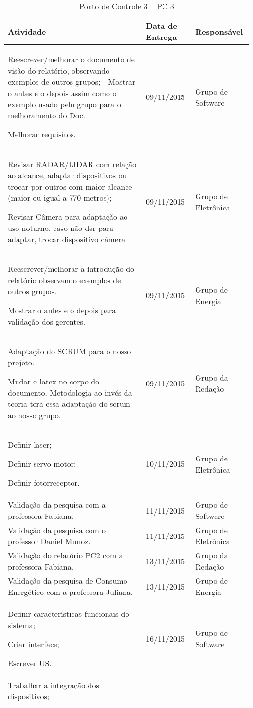 \begin{table}[]
\centering
\caption{Ponto de Controle 3 – PC  3}
\label{custo_equip}
\begin{tabular}{|p{5cm}|p{3cm}|p{5cm}|}
  \hline
  \textbf{Atividade} & \textbf{Data de Entrega} & \textbf{Responsável}\\
  \hline
  Reescrever/melhorar o documento de visão do relatório, observando exemplos de outros grupos;
- Mostrar o antes e o depois assim como o exemplo usado pelo grupo para o melhoramento do Doc.

Melhorar requisitos. & 09/11/2015 & Grupo de Software \\
  \hline
  Revisar RADAR/LIDAR com relação ao alcance, adaptar dispositivos ou trocar por outros com maior alcance (maior ou igual a 770 metros);

  Revisar Câmera para adaptação ao uso noturno, caso não der para adaptar, trocar dispositivo câmera & 09/11/2015 & Grupo de Eletrônica \\
  \hline
  Reescrever/melhorar a introdução do relatório observando exemplos de outros grupos.

 Mostrar o antes e o depois para validação dos gerentes. & 09/11/2015 & Grupo de Energia \\
  \hline
  Adaptação do SCRUM para o nosso projeto.

 Mudar o latex no corpo do documento. Metodologia ao invés da teoria terá essa adaptação do scrum ao nosso grupo.
 & 09/11/2015 & Grupo da Redação \\
  \hline
  Definir laser;

Definir servo motor;

Definir fotorreceptor. & 10/11/2015 & Grupo de Eletrônica \\
  \hline
  Validação da pesquisa com a professora Fabiana. & 11/11/2015 & Grupo de Software \\
  \hline
  Validação da pesquisa com o professor Daniel Munoz. & 11/11/2015 & Grupo de Eletrônica \\
  \hline
  Validação do relatório PC2 com a professora Fabiana. & 13/11/2015 & Grupo da Redação \\
  \hline
  Validação da pesquisa de Consumo Energético com a professora Juliana. & 13/11/2015 & Grupo de Energia \\
  \hline
  Definir características funcionais do sistema;

Criar interface;

Escrever US. & 16/11/2015 & Grupo de Software \\
  \hline
  Trabalhar a integração dos dispositivos;


\end{tabular}
\end{table}
